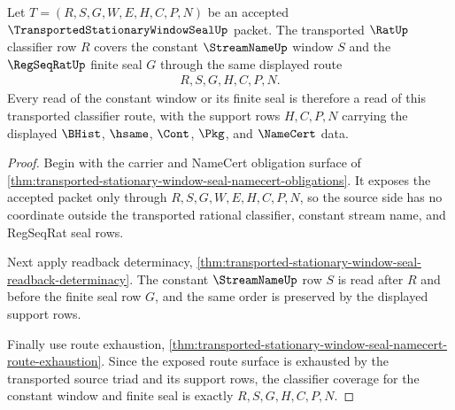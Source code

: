 \begin{theorem}
\label{thm:transported-stationary-window-seal-constant-stream-classifier-coverage}
Let $T=(R,S,G,W,E,H,C,P,N)$ be an accepted $\TransportedStationaryWindowSealUp$ packet. The transported $\RatUp$ classifier row $R$ covers the constant $\StreamNameUp$ window $S$ and the $\RegSeqRatUp$ finite seal $G$ through the same displayed route
$$
\begin{aligned}
  R,S,G,H,C,P,N .
\end{aligned}
$$
Every read of the constant window or its finite seal is therefore a read of this transported classifier route, with the support rows $H,C,P,N$ carrying the displayed $\BHist$, $\hsame$, $\Cont$, $\Pkg$, and $\NameCert$ data.
\end{theorem}
\begin{proof}
Begin with the carrier and NameCert obligation surface of \autoref{thm:transported-stationary-window-seal-namecert-obligations}. It exposes the accepted packet only through $R,S,G,W,E,H,C,P,N$, so the source side has no coordinate outside the transported rational classifier, constant stream name, and RegSeqRat seal rows.

Next apply readback determinacy, \autoref{thm:transported-stationary-window-seal-readback-determinacy}. The constant $\StreamNameUp$ row $S$ is read after $R$ and before the finite seal row $G$, and the same order is preserved by the displayed support rows.

Finally use route exhaustion, \autoref{thm:transported-stationary-window-seal-namecert-route-exhaustion}. Since the exposed route surface is exhausted by the transported source triad and its support rows, the classifier coverage for the constant window and finite seal is exactly $R,S,G,H,C,P,N$.
\end{proof}

